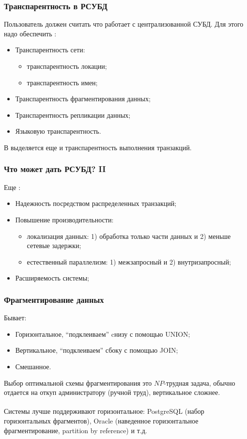 \documentclass{beamer}
\begin{document}
\begin{frame}
\frametitle{Транспарентность в РСУБД}

Пользователь должен считать что работает с централизованной СУБД. Для этого надо обеспечить \cite{Ozsu2011}:
\begin{itemize}
  \item Транспарентность сети: 
  \begin{itemize}
    \item транспарентность локации;
    \item транспарентность имен;
  \end{itemize}
  \item Транспарентность фрагментирования данных;
  \item Транспарентность репликации данных;
  \item Языковую транспарентность.
\end{itemize}

В \cite{Kian-Lee2009} выделяется еще и транспарентность выполнения транзакций.

\end{frame}


\begin{frame}
\frametitle{Что может дать РСУБД? II}

Еще \cite{Ozsu2011}:
\begin{itemize}
  \setlength\itemsep{1em}
  \item Надежность посредством распределенных транзакций;
  \item Повышение производительности:
  \begin{itemize}
    \item локализация данных: 1) обработка только части данных и 2) меньше сетевые задержки;
    \item естественный параллелизм: 1) межзапросный и 2) внутризапросный;
  \end{itemize}
  \item Расширяемость системы;
  
\end{itemize}
\end{frame}

\begin{frame}
\frametitle{Фрагментирование данных}

Бывает:
\begin{itemize}
  \setlength\itemsep{1em}
  \item Горизонтальное, ``подклеиваем'' cнизу с помощью UNION;
  \item Вертикальное, ``подклеиваем'' сбоку с помощью JOIN;
  \item Смешанное.
\end{itemize}

Выбор оптимальной схемы фрагментирования это $NP$-трудная задача, обычно отдается на откуп администратору (ручной труд), вертикальное сложнее.\\~\\

Системы лучше поддерживают горизонтальное: PostgreSQL (набор горизонтальных фрагментов), Oracle (наведенное горизонтальное фрагментирование, partition by reference) и т.д.
\end{frame}
\end{document}
